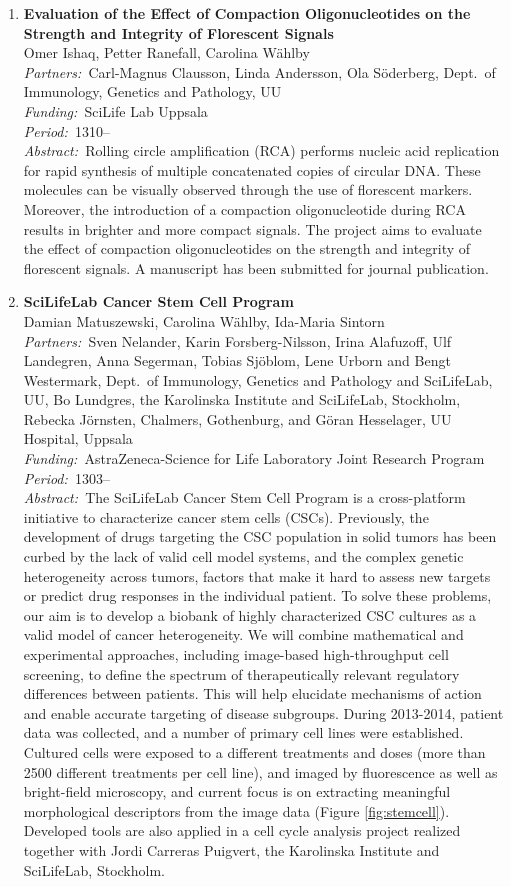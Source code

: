 \documentclass[10pt, a4paper]{article}
\newcommand{\aabstract}[1]{\emph{Abstract:~}#1}
\newcommand{\ffunding}[1]{\emph{Funding:~}#1\\}
\newcommand{\ppartners}[1]{\emph{Partners:~}#1\\}
\newcommand{\pperiod}[1]{\emph{Period:~}#1\\}
\begin{document}
{\begin{enumerate}

\item 
\textbf{Evaluation of the Effect of Compaction Oligonucleotides on the Strength and Integrity of Florescent Signals }\\
Omer Ishaq, Petter Ranefall, Carolina W\"{a}hlby\\
\ppartners{Carl-Magnus Clausson, Linda Andersson, Ola S\"{o}derberg, Dept.~of Immunology, Genetics and Pathology, UU}
\ffunding{SciLife Lab Uppsala}
\pperiod{1310--}
\aabstract{Rolling circle amplification (RCA) performs nucleic acid replication for rapid synthesis of multiple concatenated copies of circular DNA. These molecules can be visually observed through the use of florescent markers. Moreover, the introduction of a compaction oligonucleotide during RCA results in brighter and more compact signals. The project aims to evaluate the effect of compaction oligonucleotides on the strength and integrity of florescent signals. A manuscript has been submitted for journal publication.}






\item
\label{proj:stemcells}
\textbf{SciLifeLab Cancer Stem Cell Program}\\
Damian Matuszewski, Carolina W\"{a}hlby, Ida-Maria Sintorn\\
\ppartners{Sven Nelander, Karin Forsberg-Nilsson, Irina Alafuzoff, Ulf Landegren, Anna Segerman, Tobias Sj\"{o}blom, Lene Urborn and Bengt Westermark, Dept.~of Immunology, Genetics and Pathology and SciLifeLab, UU, Bo Lundgres, the Karolinska Institute and SciLifeLab, Stockholm, Rebecka J\"{o}rnsten, Chalmers, Gothenburg, and G\"{o}ran Hesselager, UU Hospital, Uppsala}
\ffunding{AstraZeneca-Science for Life Laboratory Joint Research Program}
\pperiod{1303--}
\aabstract{The SciLifeLab Cancer Stem Cell Program is a cross-platform initiative to characterize cancer stem cells (CSCs). Previously, the development of drugs targeting the CSC population in solid tumors has been curbed by the lack of valid cell model systems, and the complex genetic heterogeneity across tumors, factors that make it hard to assess new targets or predict drug responses in the individual patient. To solve these problems, our aim is to develop a biobank of highly characterized CSC cultures as a valid model of cancer heterogeneity. We will combine mathematical and experimental approaches, including image-based high-throughput cell screening, to define the spectrum of therapeutically relevant regulatory differences between patients. This will help elucidate mechanisms of action and enable accurate targeting of disease subgroups. During 2013-2014, patient data was collected, and a number of primary cell lines were established. Cultured cells were exposed to a different treatments and doses (more than 2500 different treatments per cell line), and imaged by fluorescence as well as bright-field microscopy, and current focus is on extracting meaningful morphological descriptors from the image data (Figure \ref{fig:stemcell}). 
Developed tools are also applied in a cell cycle analysis project realized together with Jordi Carreras Puigvert, the Karolinska Institute and SciLifeLab, Stockholm.}



\end{enumerate}}
\end{document}
